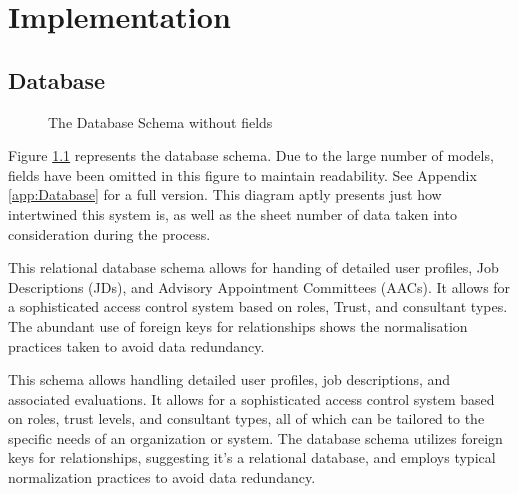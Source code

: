 \chapter{Implementation}
\section{Database} \label{Database}
\begin{figure}[h]
\centering
{}
\vspace{-20pt}
\caption{The Database Schema without fields}
\label{fig:database}
\end{figure}
\vspace{-5pt}
Figure \ref{fig:database} represents the database schema. Due to the large number of models, fields have been omitted in this figure to maintain readability. See Appendix \ref{app:Database} for a full version. This diagram aptly presents just how intertwined this system is, as well as the sheet number of data taken into consideration during the process.

This relational database schema allows for handing of detailed user profiles, Job Descriptions (JDs), and Advisory Appointment Committees (AACs). It allows for a sophisticated access control system based on roles, Trust, and consultant types. The abundant use of foreign keys for relationships shows the normalisation practices taken to avoid data redundancy.

This schema allows handling detailed user profiles, job descriptions, and associated evaluations. It allows for a sophisticated access control system based on roles, trust levels, and consultant types, all of which can be tailored to the specific needs of an organization or system. The database schema utilizes foreign keys for relationships, suggesting it’s a relational database, and employs typical normalization practices to avoid data redundancy.

